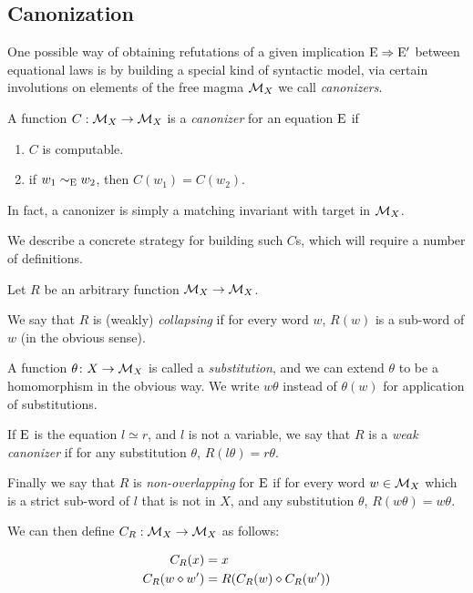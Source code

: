 \subsection{Canonization}\label{canon-sec}

One possible way of obtaining refutations of a given implication $\mathrm{E} \Rightarrow \mathrm{E}'$ between equational laws is by building a special kind of syntactic model, via certain involutions on elements of the free magma ${\mathcal{M}}_X$ we call \emph{canonizers}.

\begin{definition}
  A function $C:{\mathcal{M}}_X\rightarrow{\mathcal{M}}_X$ is a \emph{canonizer} for an equation $\mathrm{E}$ if
  \begin{enumerate}
    \item $C$ is computable.
    \item if $w_1\sim_{\mathrm{E}} w_2$, then $C(w_1) = C(w_2)$.
  \end{enumerate}
\end{definition}

In fact, a canonizer is simply a matching invariant with target in ${\mathcal{M}}_X$.

We describe a concrete strategy for building such $C$s, which will require a number of definitions.

Let $R$ be an arbitrary function ${\mathcal{M}}_X\rightarrow {\mathcal{M}}_X$.

\begin{definition}\label{def:canon}
  We say that $R$ is (weakly) \emph{collapsing} if for every word $w$, $R(w)$ is a sub-word of $w$ (in the obvious sense).

  A function $\theta\colon X\rightarrow{\mathcal{M}}_X$ is called a \emph{substitution}, and we can extend $\theta$ to be a homomorphism in the obvious way. We write $w\theta$ instead of $\theta(w)$ for application of substitutions.

  If $\mathrm{E}$ is the equation $l\simeq r$, and $l$ is not a variable, we say that $R$ is a \emph{weak canonizer} if for any substitution $\theta$, $R(l\theta)=r\theta$.

  Finally we say that $R$ is \emph{non-overlapping} for $\mathrm{E}$ if for every word $w\in{\mathcal{M}}_X$ which is a strict sub-word of $l$ that is not in $X$, and any substitution $\theta$, $R(w\theta) = w\theta$.
\end{definition}

We can then define $C_R : {\mathcal{M}}_X\rightarrow{\mathcal{M}}_X$ as follows:

\begin{align}
  C_R(x) &= x\\
  C_R(w\diamond w') &= R(C_R(w)\diamond C_R(w'))
\end{align}

